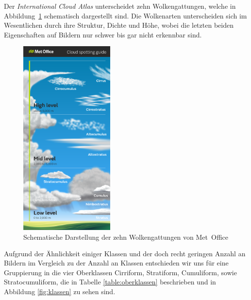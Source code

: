 \documentclass[a4,german]{article}
\begin{document}
Der \textit{International Cloud Atlas} unterscheidet zehn Wolkengattungen, welche in Abbildung~\ref{fig:cloudtypes} schematisch dargestellt sind.
Die Wolkenarten unterscheiden sich im Wesentlichen durch ihre Struktur, Dichte und Höhe, wobei die letzten beiden Eigenschaften auf Bildern nur schwer bis gar nicht erkennbar sind.

\begin{figure}[h!]
\centering
\includegraphics[height=10cm,keepaspectratio]{Cloud_infographic-01.png}
\caption{Schematische Darstellung der zehn Wolkengattungen von \mbox{Met Office}\cite{metoffice}}
    \label{fig:cloudtypes}
\end{figure}

Aufgrund der Ähnlichkeit einiger Klassen und der doch recht geringen Anzahl an Bildern im Vergleich zu der Anzahl an Klassen entschieden wir uns für eine Gruppierung in die vier Oberklassen \glqq Cirriform\grqq, \glqq Stratiform\grqq, \glqq Cumuliform\grqq, sowie \glqq Stratocumuliform\grqq, die in Tabelle \ref{table:oberklassen} beschrieben und in Abbildung \ref{fig:klassen} zu sehen sind.
\end{document}
